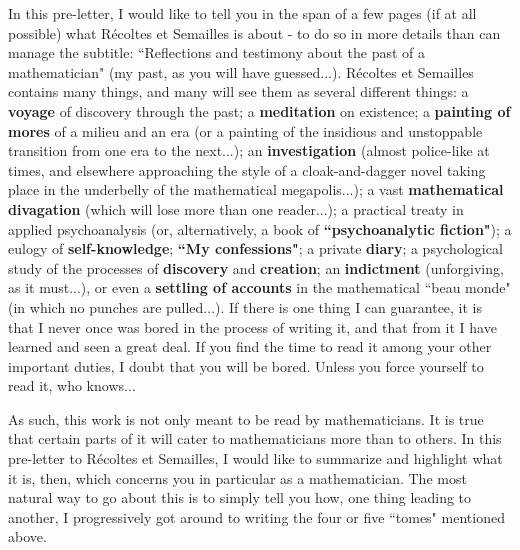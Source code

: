 In this pre-letter, I would like to tell you in the span of a few pages (if at all possible) what R\'ecoltes et Semailles is about - to do so in more details than can manage the subtitle: ``Reflections and testimony about the past of a mathematician" (my past, as you will have guessed...). R\'ecoltes et Semailles contains many things, and many will see them as several different things: a \textbf{voyage} of discovery through the past; a \textbf{meditation} on existence; a \textbf{painting of mores} of a milieu and an era (or a painting of the insidious and unstoppable transition from one era to the next...); an \textbf{investigation} (almost police-like at times, and elsewhere approaching the style of a cloak-and-dagger novel taking place in the underbelly of the mathematical megapolis...); a vast \textbf{mathematical divagation} (which will lose more than one reader...); a practical treaty in applied psychoanalysis (or, alternatively, a book of \textbf{``psychoanalytic fiction"}); a eulogy of \textbf{self-knowledge}; \textbf{``My confessions"}; a private \textbf{diary}; a psychological study of the processes of \textbf{discovery} and \textbf{creation}; an \textbf{indictment} (unforgiving, as it must...), or even a \textbf{settling of accounts} in the mathematical ``beau monde" (in which no punches are pulled...). If there is one thing I can guarantee, it is that I never once was bored in the process of writing it, and that from it I have learned and seen a great deal. If you find the time to read it among your other important duties, I doubt that you will be bored. Unless you force yourself to read it, who knows...

As such, this work is not only meant to be read by mathematicians. It is true that certain parts of it will cater to mathematicians more than to others. In this pre-letter to R\'ecoltes et Semailles, I would like to summarize and highlight what it is, then, which concerns you in particular as a mathematician. The most natural way to go about this is to simply tell you how, one thing leading to another, I progressively got around to writing the four or five ``tomes" mentioned above.


